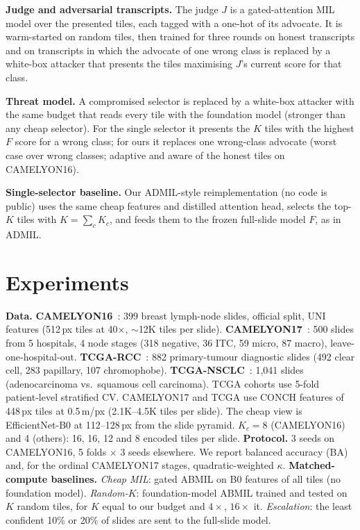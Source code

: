 \documentclass[10pt,twocolumn]{article}
\begin{document}
\textbf{Judge and adversarial transcripts.} The judge $J$ is a gated-attention MIL model over the presented tiles, each tagged with a one-hot of its advocate. It is warm-started on random tiles, then trained for three rounds on honest transcripts and on transcripts in which the advocate of one wrong class is replaced by a white-box attacker that presents the tiles maximising $J$'s current score for that class.

\textbf{Threat model.} A compromised selector is replaced by a white-box attacker with the same budget that reads every tile with the foundation model (stronger than any cheap selector). For the single selector it presents the $K$ tiles with the highest $F$ score for a wrong class; for ours it replaces one wrong-class advocate (worst case over wrong classes; adaptive and aware of the honest tiles on CAMELYON16).

\textbf{Single-selector baseline.} Our ADMIL-style reimplementation (no code is public) uses the same cheap features and distilled attention head, selects the top-$K$ tiles with $K=\sum_c K_c$, and feeds them to the frozen full-slide model $F$, as in ADMIL.

\section{Experiments}
\textbf{Data.} \textbf{CAMELYON16}~\cite{c16}: 399 breast lymph-node slides, official split, UNI features (512\,px tiles at 40$\times$, $\sim$12K tiles per slide). \textbf{CAMELYON17}~\cite{camelyon17}: 500 slides from 5 hospitals, 4 node stages (318 negative, 36 ITC, 59 micro, 87 macro), leave-one-hospital-out. \textbf{TCGA-RCC}~\cite{tcga}: 882 primary-tumour diagnostic slides (492 clear cell, 283 papillary, 107 chromophobe). \textbf{TCGA-NSCLC}~\cite{tcga}: 1{,}041 slides (adenocarcinoma vs.\ squamous cell carcinoma). TCGA cohorts use 5-fold patient-level stratified CV. CAMELYON17 and TCGA use CONCH features of 448\,px tiles at 0.5\,\textmu m/px (2.1K--4.5K tiles per slide). The cheap view is EfficientNet-B0 at 112--128\,px from the slide pyramid. $K_c{=}8$ (CAMELYON16) and 4 (others): 16, 16, 12 and 8 encoded tiles per slide.
\textbf{Protocol.} 3 seeds on CAMELYON16, 5 folds $\times$ 3 seeds elsewhere. We report balanced accuracy (BA) and, for the ordinal CAMELYON17 stages, quadratic-weighted $\kappa$.
\textbf{Matched-compute baselines.} \emph{Cheap MIL}: gated ABMIL on B0 features of all tiles (no foundation model). \emph{Random-$K$}: foundation-model ABMIL trained and tested on $K$ random tiles, for $K$ equal to our budget and $4\times$, $16\times$ it. \emph{Escalation}: the least confident 10\% or 20\% of slides are sent to the full-slide model.
\end{document}
